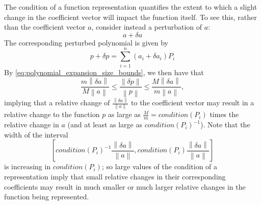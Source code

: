 \documentclass[12pt]{article}
\theoremstyle{definition}
\begin{document}
The condition of a function representation quantifies the extent to which a slight change in the coefficient vector will impact the function itself. To see this, rather than the coefficient vector $a$, consider instead a perturbation of $a$:
\[
a + \delta a
\]
\noindent
The corresponding perturbed polynomial is given by 
\[
p + \delta p = \sum_{i=1}^n \left(a_i + \delta a_i \right) P_i
\]
By \ref{eq:polynomial_expansion_size_bounds}, we then have that 
\begin{equation*}
\frac{m\left \lVert \delta a \right \rVert}{M\left \lVert a \right \rVert} \le \frac{\left \lVert \delta p \right \rVert}{\left \lVert p \right \rVert} \le \frac{M\left \lVert \delta a \right \rVert}{m\left \lVert a \right \rVert},
\end{equation*}
\noindent
implying that a relative change of $\frac{\left \lVert \delta a \right \rVert}{\left \lVert a \right \rVert}$ to the coefficient vector may result in a relative change to the function $p$ as large as $\frac{M}{m} = \textit{condition}\left(P_i\right)$ times the relative change in $a$ (and at least as large as $\textit{condition}\left(P_i\right)^{-1}$). Note that the width of the interval 
\[
\left[\textit{condition}\left(P_i\right)^{-1}\frac{\left \lVert \delta a \right \rVert}{\left \lVert a \right \rVert},\textit{condition}\left(P_i\right) \frac{\left \lVert \delta a \right \rVert}{\left \lVert a \right \rVert} \right]
\]
\noindent
is increasing in $\textit{condition}\left(P_i\right)$; so large values of the condition of a representation imply that small relative changes in their corresponding coefficients may result in much smaller or much larger relative changes in the function being represented.
\end{document}
